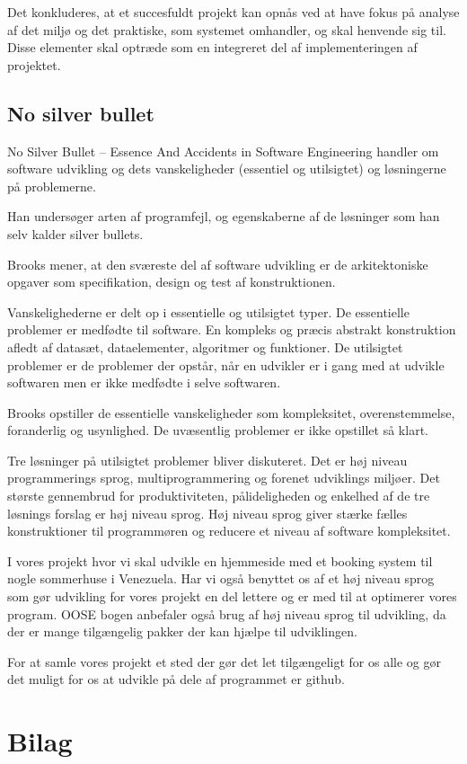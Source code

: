 \documentclass[12pt,a4paper]{article}
\begin{document}
Det konkluderes, at et succesfuldt projekt kan opnås ved at have fokus på analyse af det miljø og det praktiske, som systemet omhandler, og skal henvende sig til. Disse elementer skal optræde som en integreret del af implementeringen af projektet.
\subsection{No silver bullet}
No Silver Bullet – Essence And Accidents in Software Engineering handler om software udvikling og dets vanskeligheder (essentiel og utilsigtet) og løsningerne på problemerne. 

Han undersøger arten af programfejl, og egenskaberne af de løsninger som han selv kalder silver bullets. 

Brooks mener, at den sværeste del af software udvikling er de arkitektoniske opgaver som specifikation, design og test af konstruktionen.

Vanskelighederne er delt op i essentielle og utilsigtet typer. De essentielle problemer er medfødte  til software. En kompleks og præcis abstrakt konstruktion afledt af datasæt, dataelementer, algoritmer og funktioner. De utilsigtet problemer er de problemer der opstår, når en udvikler er i gang med at udvikle softwaren men er ikke medfødte i selve softwaren.

Brooks opstiller de essentielle vanskeligheder som kompleksitet, overenstemmelse, foranderlig og usynlighed. De uvæsentlig problemer er ikke opstillet så klart.

Tre løsninger på utilsigtet  problemer bliver diskuteret. Det er høj niveau programmerings sprog, multiprogrammering og forenet udviklings miljøer. Det største gennembrud for produktiviteten, pålideligheden og enkelhed af de tre løsnings forslag er høj niveau sprog. Høj niveau sprog giver stærke fælles konstruktioner til programmøren og reducere et niveau af software kompleksitet.

I vores projekt hvor vi skal udvikle en hjemmeside med et booking system til nogle sommerhuse i Venezuela. Har vi også benyttet os af et høj niveau sprog som gør udvikling for vores projekt en del lettere og er med til at optimerer vores program. OOSE bogen anbefaler også brug af høj niveau sprog til udvikling, da der er mange tilgængelig pakker der kan hjælpe til udviklingen.

For at samle vores projekt et sted der gør det let tilgængeligt for os alle og gør det muligt for os at udvikle på dele af programmet er github.
\newpage
\section{Bilag}
\end{document}

